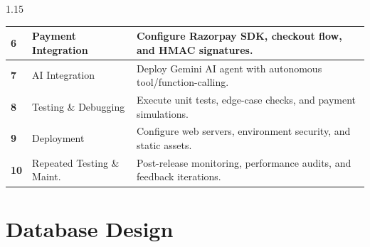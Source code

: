\documentclass[12pt,a4paper]{article}
\begin{document}
{\begin{spacing}{1.15}
\begin{center}
\begin{tabular}{|p{0.5in}|p{2.1in}|p{3.9in}|}
\textbf{6} & Payment Integration &
Configure Razorpay SDK, checkout flow, and HMAC signatures. \\ \hline

\textbf{7} & AI Integration &
Deploy Gemini AI agent with autonomous tool/function-calling. \\ \hline

\textbf{8} & Testing \& Debugging &
Execute unit tests, edge-case checks, and payment simulations. \\ \hline

\textbf{9} & Deployment &
Configure web servers, environment security, and static assets. \\ \hline

\textbf{10} & Repeated Testing \& Maint. &
Post-release monitoring, performance audits, and feedback iterations. \\ \hline

\end{tabular}
\end{center}

\end{spacing}
}


\vfill

\newpage


\section{Database Design}

\vspace{0.08in}
\end{document}
